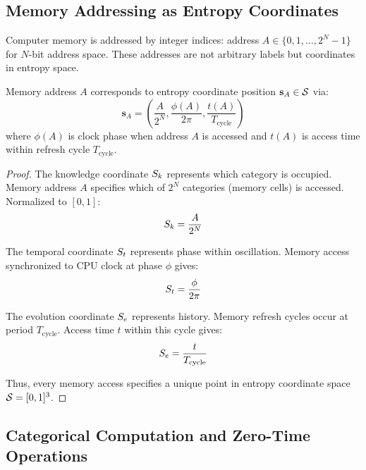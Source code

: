 \subsection{Memory Addressing as Entropy Coordinates}

Computer memory is addressed by integer indices: address $A \in \{0, 1, \ldots, 2^{N}-1\}$ for $N$-bit address space. These addresses are not arbitrary labels but coordinates in entropy space.

\begin{proposition}
\label{prop:memory_entropy}
Memory address $A$ corresponds to entropy coordinate position $\mathbf{s}_A \in \mathcal{S}$ via:
\begin{equation}
\mathbf{s}_A = \left(\frac{A}{2^N}, \frac{\phi(A)}{2\pi}, \frac{t(A)}{T_{\text{cycle}}}\right)
\end{equation}
where $\phi(A)$ is clock phase when address $A$ is accessed and $t(A)$ is access time within refresh cycle $T_{\text{cycle}}$.
\end{proposition}

\begin{proof}
The knowledge coordinate $S_k$ represents which category is occupied. Memory address $A$ specifies which of $2^N$ categories (memory cells) is accessed. Normalized to $[0,1]$:
\begin{equation}
S_k = \frac{A}{2^N}
\end{equation}

The temporal coordinate $S_t$ represents phase within oscillation. Memory access synchronized to CPU clock at phase $\phi$ gives:
\begin{equation}
S_t = \frac{\phi}{2\pi}
\end{equation}

The evolution coordinate $S_e$ represents history. Memory refresh cycles occur at period $T_{\text{cycle}}$. Access time $t$ within this cycle gives:
\begin{equation}
S_e = \frac{t}{T_{\text{cycle}}}
\end{equation}

Thus, every memory access specifies a unique point in entropy coordinate space $\mathcal{S} = [0,1]^3$.
\end{proof}

\subsection{Categorical Computation and Zero-Time Operations}

